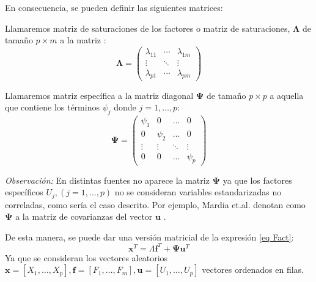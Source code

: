 \noindent En consecuencia, se pueden definir las siguientes matrices: 

\begin{defi}
Llamaremos matriz de saturaciones de los factores o matriz de saturaciones, $\mathbf{\Lambda}$ de tamaño $p \times m$ a la matriz :
\begin{equation}
\mathbf{\Lambda}=\begin{pmatrix}
\lambda_{11} & \cdots & \lambda_{1 m}\\
\vdots & \ddots & \vdots\\
\lambda_{p1} & \cdots & \lambda_{pm}
\end{pmatrix}
\end{equation}
\end{defi}

\begin{defi}
Llamaremos matriz específica a la matriz diagonal $\mathbf{\Psi}$ de tamaño $p\times p$ a aquella que contiene los términos $\psi_j$ donde $j=1,\ldots , p$:
\begin{equation}
\mathbf{\Psi}=\begin{pmatrix}
    \psi_1 & 0 & \dots & 0 \\
    0 & \psi_2 & \dots & 0 \\
    \vdots & \vdots & \ddots & \vdots \\
    0 & 0 & \dots & \psi_p
\end{pmatrix}
\end{equation}
\end{defi}

\noindent \emph{Observación:} En distintas fuentes no aparece la matriz $\mathbf{\Psi}$ ya que los factores específicos $U_j, (j=1,\ldots,p)$ no se consideran variables estandarizadas no correladas, como sería el caso descrito. Por ejemplo, Mardia et.al. denotan como $\mathbf{\Psi}$ a la matriz de covarianzas del vector $\mathbf{u}$ \cite{Mardia 1979}.

\noindent De esta manera, se puede dar una versión matricial de la expresión \ref{eq Fact}:
\begin{equation}
\mathbf{x}^T=\Lambda \mathbf{f}^T+ \mathbf{\Psi}\mathbf{u}^T
\end{equation}
Ya que se consideran los vectores aleatorios $\mathbf{x}=[X_1,\ldots,X_p], \mathbf{f}=[F_1,\ldots,F_m], \mathbf{u}=[U_1, \ldots, U_p]$ vectores ordenados en filas. 

